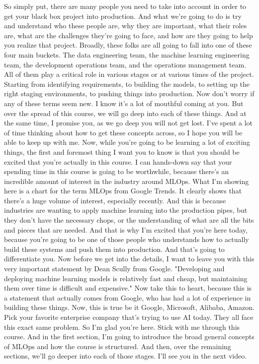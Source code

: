 So simply put, there are many people you need
to take into account in order to get your black box project into production.
And what we're going to do is try and understand who these people are,
why they are important, what their roles are,
what are the challenges they're going to face,
and how are they going to help you realize that project.
Broadly, these folks are all going to fall
into one of these four main buckets.
The data engineering team, the machine learning
engineering team, the development operations team, and the operations
management team.
All of them play a critical role in various stages
or at various times of the project.
Starting from identifying requirements, to building the models,
to setting up the right staging environments,
to pushing things into production.
Now don't worry if any of these terms seem new.
I know it's a lot of mouthful coming at you.
But over the spread of this course, we will go deep into each of these things.
And at the same time, I promise you, as we go deep you will not get lost.
I've spent a lot of time thinking about how to get these concepts across,
so I hope you will be able to keep up with me.
Now, while you're going to be learning a lot of exciting things,
the first and foremost thing I want you to know
is that you should be excited that you're actually in this course.
I can hands-down say that your spending time in this course
is going to be worthwhile, because there's
an incredible amount of interest in the industry around MLOps.
What I'm showing here is a chart for the term MLOps from Google Trends.
It clearly shows that there's a huge volume of interest,
especially recently.
And this is because industries are wanting
to apply machine learning into the production pipes,
but they don't have the necessary chops, or the understanding
of what are all the bits and pieces that are needed.
And that is why I'm excited that you're here today,
because you're going to be one of those people who
understands how to actually build these systems and push them into production.
And that's going to differentiate you.
Now before we get into the details, I want
to leave you with this very important statement by Dean Scully from Google.
"Developing and deploying machine learning models
is relatively fast and cheap, but maintaining them over time
is difficult and expensive."
Now take this to heart, because this is a statement that
actually comes from Google, who has had a lot of experience
in building these things.
Now, this is true be it Google, Microsoft, Alibaba, Amazon.
Pick your favorite enterprise company that's trying to use AI today.
They all face this exact same problem.
So I'm glad you're here.
Stick with me through this course.
And in the first section, I'm going to introduce
the broad general concepts of MLOps and how the course is structured.
And then, over the remaining sections, we'll
go deeper into each of those stages.
I'll see you in the next video.


